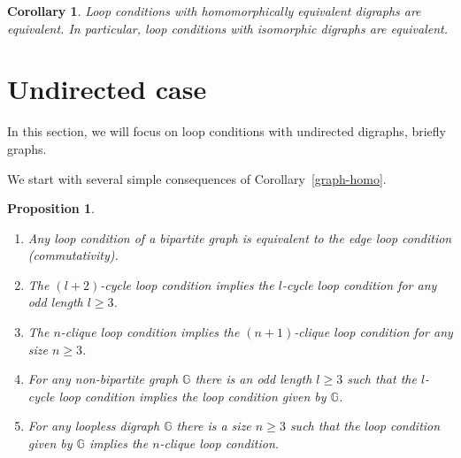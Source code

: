 \documentclass[a4paper]{article}
\newcommand{\lc}[1]{#1}
\newcommand{\relstr}[1]{\mathbb{#1}}
\newtheorem{proposition}{Proposition}
\newtheorem{corollary}{Corollary}
\begin{document}
\begin{corollary}
  \label{graph-eq}
  Loop conditions with homomorphically equivalent digraphs are
  equivalent. In particular, loop conditions with isomorphic digraphs
  are equivalent.
\end{corollary}

%
%
%
%

\section{Undirected case}

In this section, we will focus on loop conditions with 
undirected digraphs, briefly graphs.


We start with several simple consequences of 
Corollary~\ref{graph-homo}.


\begin{proposition}
  \label{triv-sym-impl}
  \begin{enumerate}
    \item Any loop condition of a bipartite graph is equivalent to the edge loop condition (commutativity).
    \item The $(l+2)$-cycle loop condition implies the $l$-cycle loop condition for any odd length $l\geq3$.
    \item The $n$-clique loop condition implies the $(n+1)$-clique loop condition for any size $n\geq3$.
    \item For any non-bipartite graph $\relstr G$ there is an odd
      length $l\geq 3$ such that the $l$-cycle loop condition implies
      the loop condition given by $\relstr G$.
    \item For any loopless digraph $\relstr G$ there is a size
      $n\geq 3$ such that the loop condition given by $\relstr G$
      implies the $n$-clique loop condition.
  \end{enumerate}
\end{proposition}
\end{document}
